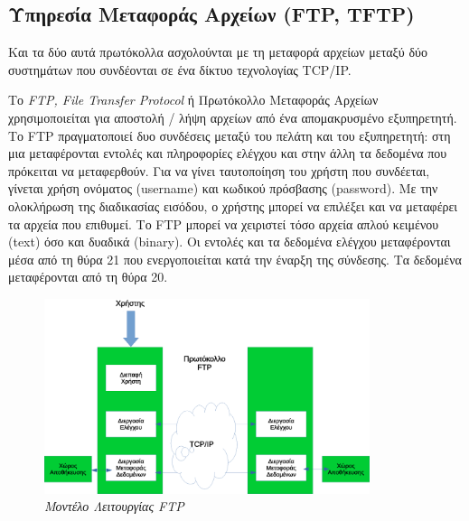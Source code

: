 %
%
\subsection{Υπηρεσία Μεταφοράς Αρχείων (FTP, TFTP)}

Και τα δύο αυτά πρωτόκολλα ασχολούνται με τη μεταφορά αρχείων μεταξύ δύο συστημάτων που συνδέονται σε ένα δίκτυο τεχνολογίας TCP/IP.

Το \emph{FTP, File Transfer Protocol} ή Πρωτόκολλο Μεταφοράς Αρχείων χρησιμοποιείται για αποστολή / λήψη αρχείων από ένα απομακρυσμένο εξυπηρετητή. Το FTP πραγματοποιεί δυο συνδέσεις μεταξύ του πελάτη και του εξυπηρετητή: στη μια μεταφέρονται εντολές και πληροφορίες ελέγχου και στην άλλη τα δεδομένα που πρόκειται να μεταφερθούν. Για να γίνει ταυτοποίηση του χρήστη που συνδέεται, γίνεται χρήση ονόματος (username) και κωδικού πρόσβασης (password). Με την ολοκλήρωση της διαδικασίας εισόδου, ο χρήστης μπορεί να επιλέξει και να μεταφέρει τα αρχεία που επιθυμεί. Το FTP μπορεί να χειριστεί τόσο αρχεία απλού κειμένου (text) όσο και δυαδικά (binary). Οι εντολές και τα δεδομένα ελέγχου μεταφέρονται μέσα από τη θύρα 21 που ενεργοποιείται κατά την έναρξη της σύνδεσης. Τα δεδομένα μεταφέρονται από τη θύρα 20.

\begin{figure}[!ht]
 \centering
 \includegraphics[width=0.85\textwidth]{images/chapter6/6-8}
 \caption {\textsl{Μοντέλο Λειτουργίας FTP}}
 \label{6-8}
\end{figure}

